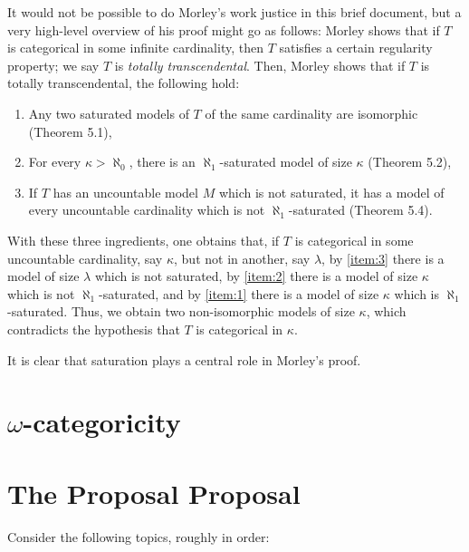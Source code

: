 \documentclass{article}
\theoremstyle{nonumberplain}
\begin{document}
It would not be possible to do Morley's work justice in this brief document, but a very high-level overview of his proof might go as follows: Morley shows that if $T$ is categorical in some infinite cardinality, then $T$ satisfies a certain regularity property; we say $T$ is \emph{totally transcendental}. Then, Morley shows that if $T$ is totally transcendental, the following hold:
\begin{enumerate}
\item\label{item:3} Any two saturated models of $T$ of the same cardinality are isomorphic (Theorem 5.1),
\item\label{item:1} For every $\kappa > \aleph_0$, there is an $\aleph_1$-saturated model of size $\kappa$ (Theorem 5.2),
\item	\label{item:2} If $T$ has an uncountable model $M$ which is not saturated, it has a model of every uncountable cardinality which is not $\aleph_1$-saturated (Theorem 5.4).
\end{enumerate}

With these three ingredients, one obtains that, if $T$ is categorical in some uncountable cardinality, say $\kappa$, but not in another, say $\lambda$, by \ref{item:3} there is a model of size $\lambda$ which is not saturated, by \ref{item:2} there is a model of size $\kappa$ which is not $\aleph_1$-saturated, and by \ref{item:1} there is a model of size $\kappa$ which is $\aleph_1$-saturated. Thus, we obtain two non-isomorphic models of size $\kappa$, which contradicts the hypothesis that $T$ is categorical in $\kappa$.

It is clear that saturation plays a central role in Morley's proof.

\section{$\omega$-categoricity}




\section{The Proposal Proposal}

Consider the following topics, roughly in order:
\end{document}
